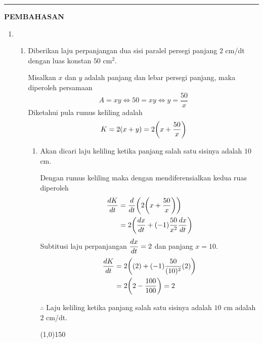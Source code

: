 \vspace{0.2cm}
\hrule height 1pt
\vspace{0.5cm}
\begin{center}
    \textbf{\large{PEMBAHASAN}}
\end{center}
\begin{enumerate}[leftmargin=*, label={\arabic*}.]
\item
\begin{enumerate}[label={\alph*}.]
    \item Diberikan laju perpanjangan dua sisi paralel persegi panjang $2$ cm/dt dengan 
    luas konstan $50$ cm$^{2}$.

    Misalkan $x$ dan $y$ adalah panjang dan lebar persegi panjang, maka diperoleh persamaan
    \[
    A = xy \iff 50 = xy \iff y = \frac{50}{x}
    \]
    Diketahui pula rumus keliling adalah
    \[
    K = 2(x+y) = 2\bracket*{x+\frac{50}{x}}
    \]
    \begin{enumerate}[label={\roman*}.]
        \item Akan dicari laju keliling ketika panjang salah satu sisinya adalah $10$ cm.
        
        Dengan rumus keliling maka dengan mendiferensialkan kedua ruas diperoleh
        \begin{align*}
            \frac{dK}{dt} &= \drv{t}{2\bracket*{x+\frac{50}{x}}}\\
            &=2\bracket*{\frac{dx}{dt}+(-1)\frac{50}{x^{2}}\frac{dx}{dt}}\\
        \end{align*}
        Subtitusi laju perpanjangan $\displaystyle \frac{dx}{dt} = 2$ dan panjang $x=10$.
        \begin{align*}
            \frac{dK}{dt} &=2\bracket*{(2)+(-1)\frac{50}{(10)^{2}}(2)}\\
            &=2\bracket*{2-\frac{100}{100}} = 2
        \end{align*}

        $\therefore$ Laju keliling ketika panjang salah satu sisinya adalah $10$ cm adalah
        $2$ cm/dt.
\begin{center}
    \line(1,0){150}
\end{center}


\end{enumerate}
\end{enumerate}
\end{enumerate}

